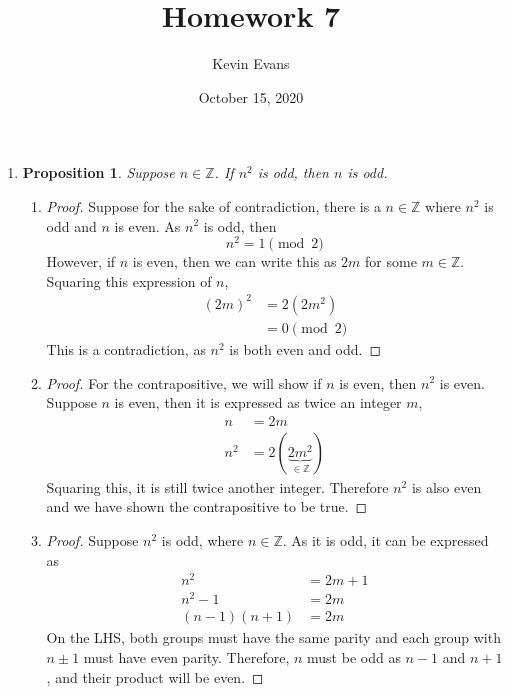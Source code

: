 \documentclass{homework}
\title{Homework 7}
\author{Kevin Evans}
\date{October 15, 2020}
\newtheorem*{prop}{Proposition}
\begin{document}
	\maketitle
	

	\begin{enumerate}
		\item \begin{minipage}[t]{\linewidth}
			\begin{prop}
				Suppose $n \in \mathbb{Z}$. If $n^2$ is odd, then $n$ is odd.
			\end{prop}
		
			\begin{enumerate}
				\item \begin{proof} Suppose for the sake of contradiction, there is a $n \in \mathbb{Z}$ where $n^2$ is odd and $n$ is even. As $n^2$ is odd, then
					\[ n^2 = 1 \pmod{2} \]
				However, if $n$ is even, then we can write this as $2m$ for some $m \in \mathbb{Z}$. Squaring this expression of $n$, \begin{align*}
					\left(2m\right)^2 & = 2\left(2m^2\right) \\
						& = 0 \pmod{2}
				\end{align*}
				This is a contradiction, as $n^2$ is both even and odd.
				\end{proof}
			
				\item \begin{proof}
					For the contrapositive, we will show if $n$ is even, then $n^2$ is even. Suppose $n$ is even, then it is expressed as twice an integer $m$, \begin{align*}
						n & = 2m \\
						n^2 & = 2(\underbrace{2m^2}_{\in \mathbb{Z}})
					\end{align*}
					Squaring this, it is still twice another integer. Therefore $n^2$ is also even and we have shown the contrapositive to be true.
				\end{proof}
			
				\item \begin{proof}
					Suppose $n^2$ is odd, where $n \in \mathbb{Z}$. As it is odd, it can be expressed as \begin{align*}
						n^2 & = 2m + 1 \\
						n^2 - 1 & = 2m \\
						\left(n - 1\right)\left(n + 1\right) & = 2m
					\end{align*}
					On the LHS, both groups must have the same parity and each group with $n \pm 1$ must have even parity. Therefore, $n$ must be odd as $n - 1$ and $n+1$, and their product will be even.
				\end{proof}
			\end{enumerate}
		\end{minipage}
	

\end{enumerate}
\end{document}
